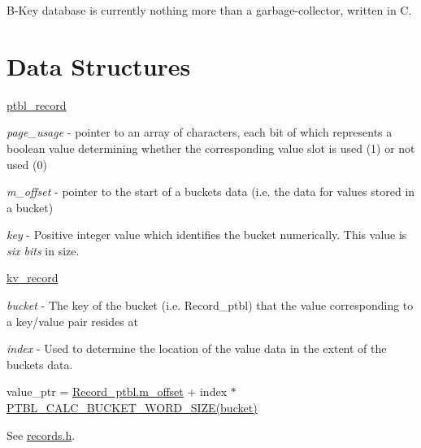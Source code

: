 B-\/\+Key database is currently nothing more than a garbage-\/collector, written in C.\hypertarget{index_data-structures}{}\section{Data Structures }\label{index_data-structures}

\begin{DoxyItemize}
\item \mbox{\hyperlink{structptbl__record}{ptbl\+\_\+record}}
\begin{DoxyItemize}
\item {\itshape page\+\_\+usage} -\/ pointer to an array of characters, each bit of which represents a boolean value determining whether the corresponding value slot is used (1) or not used (0)
\item {\itshape m\+\_\+offset} -\/ pointer to the start of a bucket\textquotesingle{}s data (i.\+e. the data for values stored in a bucket)
\item {\itshape key} -\/ Positive integer value which identifies the bucket numerically. This value is {\itshape six bits} in size.
\end{DoxyItemize}
\item \mbox{\hyperlink{structkv__record}{kv\+\_\+record}}
\begin{DoxyItemize}
\item {\itshape bucket} -\/ The key of the bucket (i.\+e. Record\+\_\+ptbl) that the value corresponding to a key/value pair resides at
\item {\itshape index} -\/ Used to determine the location of the value data in the extent of the bucket\textquotesingle{}s data.
\begin{DoxyItemize}
\item value\+\_\+ptr = \mbox{\hyperlink{structptbl__record_acec45fcdf4427d3a1b62c84973d5f484}{Record\+\_\+ptbl.\+m\+\_\+offset}} + index $\ast$ \mbox{\hyperlink{records_8h_ab49380468cb45feb3cc044c7337b5e7c}{P\+T\+B\+L\+\_\+\+C\+A\+L\+C\+\_\+\+B\+U\+C\+K\+E\+T\+\_\+\+W\+O\+R\+D\+\_\+\+S\+I\+Z\+E(bucket)}}
\end{DoxyItemize}
\end{DoxyItemize}
\end{DoxyItemize}

See \mbox{\hyperlink{records_8h}{records.\+h}}. 